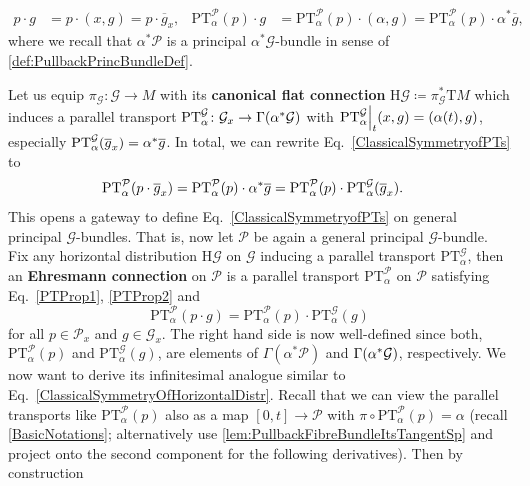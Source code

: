 \documentclass[reqno,a4paper,oneside]{amsart}
\theoremstyle{plain}
\theoremstyle{remark}
\theoremstyle{definition}
\begin{document}
\begin{align*}
p \cdot g
&=
p \cdot (x, g)
=
p \cdot \overline{g}_x,&
\mathrm{PT}_\alpha^{\mathcal{P}}(p) \cdot g
&=
\mathrm{PT}_\alpha^{\mathcal{P}}(p) \cdot (\alpha, g)
=
\mathrm{PT}_\alpha^{\mathcal{P}}(p) \cdot \alpha^*\overline{g},
\end{align*}
where we recall that $\alpha^*\mathcal{P}$ is a principal $\alpha^*\mathcal{G}$-bundle in sense of \ref{def:PullbackPrincBundleDef}. 

Let us equip $\pi_{\mathcal{G}} \colon \mathcal{G} \to M$ with its \textbf{canonical flat connection} $\mathrm{H}\mathcal{G} \coloneqq \pi^*_{\mathcal{G}}\mathrm{T}M$ which induces a parallel transport $\mathrm{PT}_\alpha^{\mathcal{G}} \colon \mathcal{G}_{x} \to \Gamma\mleft(\alpha^*\mathcal{G}\mright)$ with $\mleft.\mathrm{PT}_\alpha^{\mathcal{G}}\mright|_t(x, g) = ( \alpha(t), g)$, especially $\mathrm{PT}_\alpha^{\mathcal{G}}\mleft( \overline{g}_x \mright) = \alpha^*\overline{g}$. In total, we can rewrite Eq.\ \eqref{ClassicalSymmetryofPTs} to
\begin{align*}
\mathrm{PT}_\alpha^{\mathcal{P}}\mleft(p \cdot \overline{g}_x\mright)
&=
\mathrm{PT}_\alpha^{\mathcal{P}}(p) \cdot \alpha^*\overline{g}
=
\mathrm{PT}_\alpha^{\mathcal{P}}(p) \cdot \mathrm{PT}_\alpha^{\mathcal{G}}\mleft( \overline{g}_x \mright).
\end{align*}
This opens a gateway to define Eq.\ \eqref{ClassicalSymmetryofPTs} on general principal $\mathcal{G}$-bundles. That is, now let $\mathcal{P}$ be again a general principal $\mathcal{G}$-bundle. Fix any horizontal distribution $\mathrm{H}\mathcal{G}$ on $\mathcal{G}$ inducing a parallel transport $\mathrm{PT}_\alpha^{\mathcal{G}}$, then an \textbf{Ehresmann connection} on $\mathcal{P}$ is a parallel transport $\mathrm{PT}_\alpha^{\mathcal{P}}$ on $\mathcal{P}$ satisfying Eq.\ \eqref{PTProp1}, \eqref{PTProp2} and
\begin{equation}\label{PTHomomNEw}
\mathrm{PT}_\alpha^{\mathcal{P}}(p \cdot g)
=
\mathrm{PT}_\alpha^{\mathcal{P}}(p) \cdot \mathrm{PT}_\alpha^{\mathcal{G}}(g)
\end{equation}
for all $p \in \mathcal{P}_x$ and $g \in \mathcal{G}_x$. The right hand side is now well-defined since both, $\mathrm{PT}_\alpha^{\mathcal{P}}(p)$ and $\mathrm{PT}_\alpha^{\mathcal{G}}(g)$, are elements of $\Gamma(\alpha^*\mathcal{P})$ and $\Gamma\mleft(\alpha^*\mathcal{G}\mright)$, respectively. We now want to derive its infinitesimal analogue similar to Eq.\ \eqref{ClassicalSymmetryOfHorizontalDistr}. Recall that we can view the parallel transports like $\mathrm{PT}_\alpha^{\mathcal{P}}(p)$ also as a map $[0, t] \to \mathcal{P}$ with $\pi \circ \mathrm{PT}_\alpha^{\mathcal{P}}(p) = \alpha$ (recall \ref{BasicNotations}; alternatively use \ref{lem:PullbackFibreBundleItsTangentSp} and project onto the second component for the following derivatives). Then by construction
\end{document}

